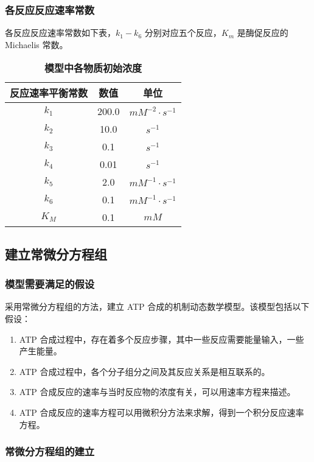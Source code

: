 \documentclass{ctexart}
\begin{document}
\subsubsection{各反应反应速率常数}
各反应反应速率常数如下表，$k_1 - k_6$ 分别对应五个反应，$K_m$ 是酶促反应的 Michaelis 常数。

\begin{table}[H]
    \centering
    \begin{tabular}{ccc}
        \toprule
        反应速率平衡常数 & 数值 & 单位\\
        \midrule
        $k_1$ & 200.0 & $mM^{-2} \cdot s^{-1}$\\
        $k_2$ & 10.0 & $s^{-1}$\\
        $k_3$ & 0.1 & $s^{-1}$\\
        $k_4$ & 0.01 & $s^{-1}$\\
        $k_5$ & 2.0 & $mM^{-1} \cdot s^{-1}$\\
        $k_6$ & 0.1 & $mM^{-1} \cdot s^{-1}$\\
        $K_M$ & 0.1 & $mM$ \\
        \bottomrule
    \end{tabular}
    \caption{\textbf{模型中各物质初始浓度}}
\end{table}

\subsection{建立常微分方程组}
\subsubsection{模型需要满足的假设}

采用常微分方程组的方法，建立 ATP 合成的机制动态数学模型。该模型包括以下假设：

\begin{enumerate}
    \item ATP 合成过程中，存在着多个反应步骤，其中一些反应需要能量输入，一些产生能量。
    \item ATP 合成过程中，各个分子组分之间及其反应关系是相互联系的。
    \item ATP 合成反应的速率与当时反应物的浓度有关，可以用速率方程来描述。
    \item ATP 合成反应的速率方程可以用微积分方法来求解，得到一个积分反应速率方程。
\end{enumerate}

\subsubsection{常微分方程组的建立}
\end{document}
